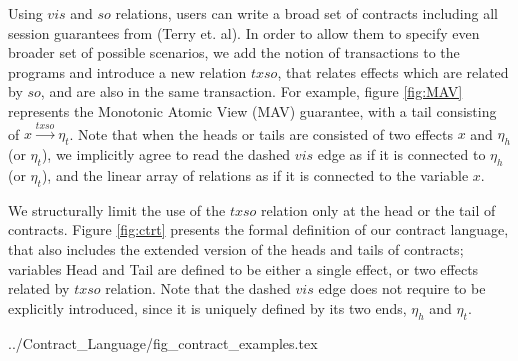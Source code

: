 Using $vis$ and $so$ relations, users can write a broad set of contracts including all session guarantees from (Terry et. al). In order to allow them to specify even broader set of possible scenarios, we add the notion of transactions to the programs and introduce a new relation $txso$, that relates effects which are related by $so$, and are also in the same transaction. For example, figure \ref{fig:MAV} represents the Monotonic Atomic View (MAV) guarantee, with a tail consisting of $x \xrightarrow {txso} \eta_t$. Note that when the heads or tails are consisted of two effects $x$ and $\eta_{h}$ (or $\eta_{t}$), we implicitly agree to read the dashed $vis$ edge as if it is connected to $\eta_{h}$ (or $\eta_{t}$), and the linear array of relations as if it is connected to the variable $x$.

We structurally limit the use of the $txso$ relation only at the head or the tail of contracts. Figure \ref{fig:ctrt} presents the formal definition of our contract language, that also includes the extended version of the heads and tails of contracts; variables Head and Tail are defined to be either a single effect, or two effects related by $txso$ relation. Note that the dashed $vis$ edge does not require to be explicitly introduced, since it is uniquely defined by its two ends, $\eta_h$ and $\eta_t$.

 {../Contract_Language/fig_contract_examples.tex}
